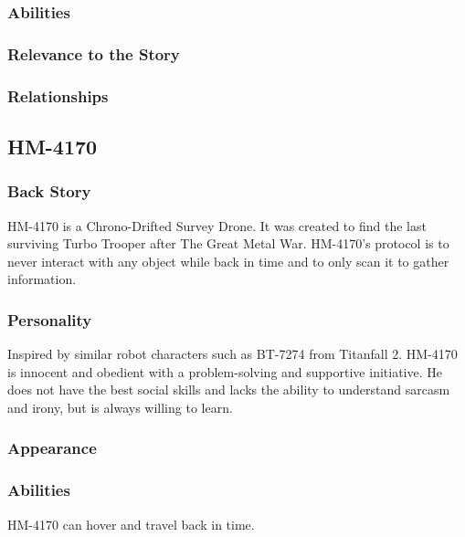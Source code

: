 \documentclass[12pt]{article}
\begin{document}
\subsubsection{Abilities}

\subsubsection{Relevance to the Story}

\subsubsection{Relationships}

\subsection{HM-4170}

\subsubsection{Back Story}

HM-4170 is a Chrono-Drifted Survey Drone. It was created to find the last surviving Turbo Trooper after The Great Metal War. HM-4170's protocol is to never interact with any object while back in time and to only scan it to gather information.

\subsubsection{Personality}

Inspired by similar robot characters such as BT-7274 from Titanfall 2. HM-4170 is innocent and obedient with a problem-solving and supportive initiative. He does not have the best social skills and lacks the ability to understand sarcasm and irony, but is always willing to learn.

\subsubsection{Appearance}

\subsubsection{Abilities}

HM-4170 can hover and travel back in time. %
\end{document}
